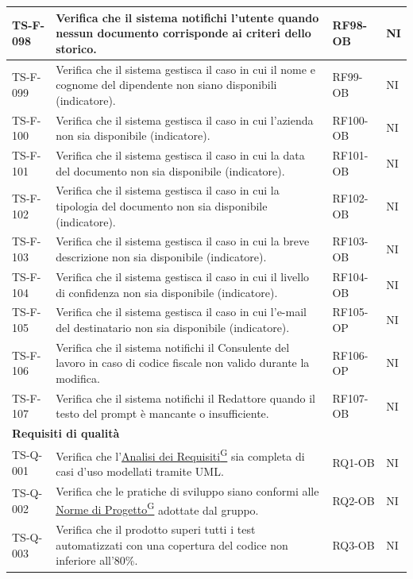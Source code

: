 \documentclass[a4paper,12pt]{article}
\providecommand{\glslink}[2]{\href{https://alittlebyte-19.github.io/Documentazione/glossario.html\#gls-#1}{\underline{#2}\textsuperscript{\scriptsize G}}}
\begin{document}
\begin{longtable}{|p{2.2cm}|p{9.5cm}|p{2.3cm}|p{1.5cm}|}
    \hline
    TS-F-098 & Verifica che il sistema notifichi l'utente quando nessun documento corrisponde ai criteri dello storico. & RF98-OB & NI \\
    \hline
    TS-F-099 & Verifica che il sistema gestisca il caso in cui il nome e cognome del dipendente non siano disponibili (indicatore). & RF99-OB & NI \\
    \hline
    TS-F-100 & Verifica che il sistema gestisca il caso in cui l'azienda non sia disponibile (indicatore). & RF100-OB & NI \\
    \hline
    TS-F-101 & Verifica che il sistema gestisca il caso in cui la data del documento non sia disponibile (indicatore). & RF101-OB & NI \\
    \hline
    TS-F-102 & Verifica che il sistema gestisca il caso in cui la tipologia del documento non sia disponibile (indicatore). & RF102-OB & NI \\
    \hline
    TS-F-103 & Verifica che il sistema gestisca il caso in cui la breve descrizione non sia disponibile (indicatore). & RF103-OB & NI \\
    \hline
    TS-F-104 & Verifica che il sistema gestisca il caso in cui il livello di confidenza non sia disponibile (indicatore). & RF104-OB & NI \\
    \hline
    TS-F-105 & Verifica che il sistema gestisca il caso in cui l'e-mail del destinatario non sia disponibile (indicatore). & RF105-OP & NI \\
    \hline
    TS-F-106 & Verifica che il sistema notifichi il Consulente del lavoro in caso di codice fiscale non valido durante la modifica. & RF106-OP & NI \\
    \hline
    TS-F-107 & Verifica che il sistema notifichi il Redattore quando il testo del prompt è mancante o insufficiente. & RF107-OB & NI \\
    \hline
    \multicolumn{4}{|l|}{\cellcolor{gray!12}\textbf{Requisiti di qualità}} \\
    \hline
    TS-Q-001 & Verifica che l'\glslink{analisi-dei-requisiti-adr}{Analisi dei Requisiti} sia completa di casi d'uso modellati tramite UML. & RQ1-OB & NI \\
    \hline
    TS-Q-002 & Verifica che le pratiche di sviluppo siano conformi alle \glslink{norme-di-progetto}{Norme di Progetto} adottate dal gruppo. & RQ2-OB & NI \\
    \hline
    TS-Q-003 & Verifica che il prodotto superi tutti i test automatizzati con una copertura del codice non inferiore all'80\%. & RQ3-OB & NI \\

\end{longtable}
\end{document}
